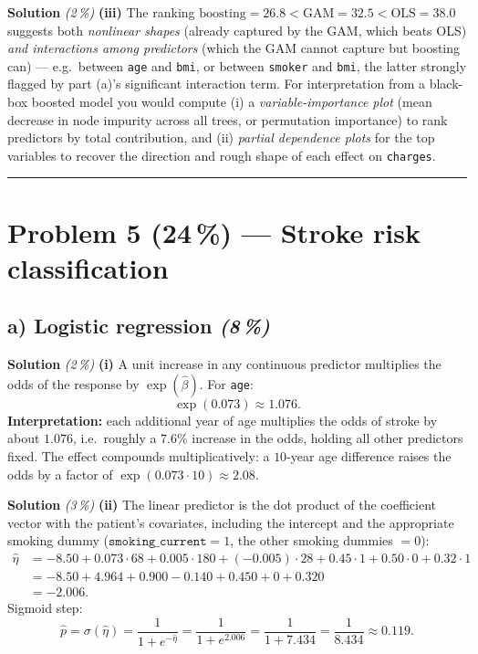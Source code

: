 \documentclass[11pt,a4paper]{article}
\newcommand{\points}[1]{\textbf{(#1\,\%)}}
\newcommand{\subpoints}[1]{\textit{(#1\,\%)}}
\newcommand{\sol}{\noindent\textbf{Solution}}
\begin{document}
\medskip
\sol{} \subpoints{2} \textbf{(iii)} The ranking $\text{boosting}=26.8 < \text{GAM}=32.5 < \text{OLS}=38.0$
suggests both \emph{nonlinear shapes} (already captured by the GAM, which beats OLS) \emph{and
interactions among predictors} (which the GAM cannot capture but boosting can) --- e.g.\ between
\texttt{age} and \texttt{bmi}, or between \texttt{smoker} and \texttt{bmi}, the latter strongly
flagged by part (a)'s significant interaction term. For interpretation from a black-box boosted
model you would compute (i) a \emph{variable-importance plot} (mean decrease in node impurity
across all trees, or permutation importance) to rank predictors by total contribution, and
(ii) \emph{partial dependence plots} for the top variables to recover the direction and rough
shape of each effect on \texttt{charges}.

\vspace{0.6em}
\hrule
\vspace{1em}

\section*{Problem 5 \points{24} --- Stroke risk classification}

\subsection*{a) Logistic regression \subpoints{8}}

\sol{} \subpoints{2} \textbf{(i)} A unit increase in any continuous predictor multiplies the odds
of the response by $\exp(\hat\beta)$. For \texttt{age}:
$$\exp(0.073) \approx \boxed{1.076}.$$
\textbf{Interpretation:} each additional year of age multiplies the odds of stroke by about
$1.076$, i.e.\ roughly a $7.6\%$ increase in the odds, holding all other predictors fixed. The
effect compounds multiplicatively: a $10$-year age difference raises the odds by a factor of
$\exp(0.073\cdot 10)\approx 2.08$.

\medskip
\sol{} \subpoints{3} \textbf{(ii)} The linear predictor is the dot product of the coefficient
vector with the patient's covariates, including the intercept and the appropriate smoking dummy
($\texttt{smoking\_current}=1$, the other smoking dummies $=0$):
\begin{align*}
\hat\eta &= -8.50
   + 0.073\cdot 68
   + 0.005\cdot 180
   + (-0.005)\cdot 28
   + 0.45\cdot 1
   + 0.50\cdot 0
   + 0.32\cdot 1 \\[2pt]
&= -8.50 + 4.964 + 0.900 - 0.140 + 0.450 + 0 + 0.320 \\[2pt]
&= \boxed{-2.006}.
\end{align*}
Sigmoid step:
$$\hat p = \sigma(\hat\eta) = \frac{1}{1+e^{-\hat\eta}} = \frac{1}{1+e^{2.006}}
   = \frac{1}{1+7.434} = \frac{1}{8.434} \approx \boxed{0.119}.$$
\end{document}
